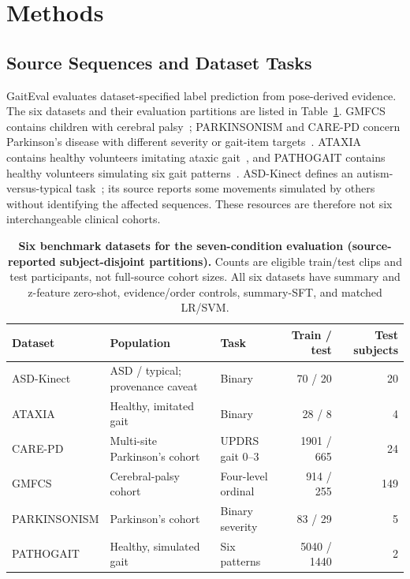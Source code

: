 \section{Methods}
\label{sec:methods}
\subsection{Source Sequences and Dataset Tasks}
\label{sec:benchmark_formulation}
GaitEval evaluates dataset-specified label prediction from pose-derived evidence. The six datasets and their evaluation partitions are listed in Table~\ref{tab:method_datasets}. GMFCS contains children with cerebral palsy~\cite{palisano1997gmfcs}; PARKINSONISM and CARE-PD concern Parkinson's disease with different severity or gait-item targets~\cite{deng2024parkinsonism,adeli2025carepd}. ATAXIA contains healthy volunteers imitating ataxic gait~\cite{khalil2023dataset}, and PATHOGAIT contains healthy volunteers simulating six gait patterns~\cite{jun2020pathological}. ASD-Kinect defines an autism-versus-typical task~\cite{aljubouri2021asd}; its source reports some movements simulated by others without identifying the affected sequences. These resources are therefore not six interchangeable clinical cohorts.

\begin{table}[t]
\centering\small
\caption{\textbf{Six benchmark datasets for the seven-condition evaluation (source-reported subject-disjoint partitions).} Counts are eligible train/test clips and test participants, not full-source cohort sizes. All six datasets have summary and z-feature zero-shot, evidence/order controls, summary-SFT, and matched LR/SVM.}
\label{tab:method_datasets}
\begin{tabular*}{\textwidth}{@{\extracolsep{\fill}}lllrr@{}}\toprule
Dataset & Population & Task & Train / test & Test subjects\\\midrule
ASD-Kinect & ASD / typical; provenance caveat & Binary & 70 / 20 & 20\\
ATAXIA & Healthy, imitated gait & Binary & 28 / 8 & 4\\
CARE-PD & Multi-site Parkinson's cohort & UPDRS gait 0--3 & 1901 / 665 & 24\\
GMFCS & Cerebral-palsy cohort & Four-level ordinal & 914 / 255 & 149\\
PARKINSONISM & Parkinson's cohort & Binary severity & 83 / 29 & 5\\
PATHOGAIT & Healthy, simulated gait & Six patterns & 5040 / 1440 & 2\\\bottomrule
\end{tabular*}
\end{table}

